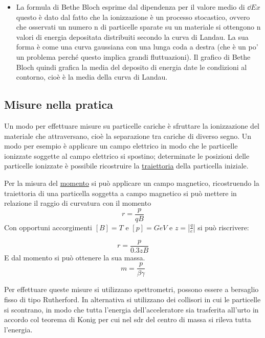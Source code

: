 \documentclass[12pt]{book}
\begin{document}
\begin{itemize}
\item La formula di Bethe Bloch esprime dal dipendenza per il valore medio di $\dd{E}{x}$ questo è dato dal fatto che la ionizzazione è un processo stocastico, ovvero che osservati un numero n di particelle sparate su un materiale si ottengono n valori di energia depositata distribuiti secondo la curva di Landau. La sua forma è come una curva gaussiana con una lunga coda a destra (che è un po' un problema perché questo implica grandi fluttuazioni). Il grafico di Bethe Bloch quindi grafica la media del deposito di energia date le condizioni al contorno, cioè è la media della curva di Landau.
\end{itemize}

\subsection{Misure nella pratica}
Un modo per effettuare misure su particelle cariche è sfruttare la ionizzazione del materiale che attraversano, cioè la separazione tra cariche di diverso segno. Un modo per esempio è applicare un campo elettrico in modo che le particelle ionizzate soggette al campo elettrico si spostino; determinate le posizioni delle particelle ionizzate è possibile ricostruire la \underline{traiettoria} della particella iniziale. 


Per la misura del \underline{momento} si può applicare un campo magnetico, ricostruendo la traiettoria di una particella soggetta a campo magnetico si può mettere in relazione il raggio di curvatura con il momento 
\begin{equation}
	r=\frac{p}{qB}
\end{equation}
Con opportuni accorgimenti $[B]=T$ e $[p]=GeV$ e $z=\left|\frac{q}{e}\right|$ si può riscrivere:

\begin{equation}
	r = \frac{p}{0.3zB}
\end{equation}
E dal momento si può ottenere la sua massa. 
\begin{equation}
	m= \frac{p}{\beta \gamma}
\end{equation}

Per effettuare queste misure si utilizzano spettrometri, possono essere a bersaglio fisso di tipo Rutherford. In alternativa si utilizzano dei collisori in cui le particelle si scontrano, in modo che tutta l'energia dell'acceleratore sia trasferita all'urto in accordo col teorema di Konig per cui nel sdr del centro di massa si rileva tutta l'energia. 
\end{document}
